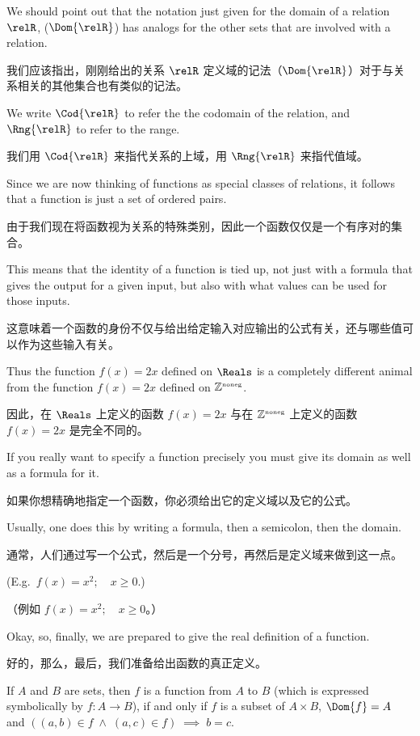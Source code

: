 We should point out that the notation just given for the domain of a 
relation $\relR$, ($\Dom{\relR}$) has analogs for the other 
sets that are involved with a relation.

我们应该指出，刚刚给出的关系 $\relR$ 定义域的记法（$\Dom{\relR}$）对于与关系相关的其他集合也有类似的记法。

We write $\Cod{\relR}$
to refer the the codomain of the relation, and $\Rng{\relR}$
to refer to the range.

我们用 $\Cod{\relR}$ 来指代关系的上域，用 $\Rng{\relR}$ 来指代值域。

Since we are now thinking of functions as special classes of relations, it follows that a function is just 
a set of ordered pairs.

由于我们现在将函数视为关系的特殊类别，因此一个函数仅仅是一个有序对的集合。

This means that the identity of a function is
tied up, not just with a formula that gives the output for a given input,
but also with what values can be used for those inputs.

这意味着一个函数的身份不仅与给出给定输入对应输出的公式有关，还与哪些值可以作为这些输入有关。

Thus the function
$f(x)=2x$ defined on $\Reals$ is a completely different animal from 
the function $f(x)=2x$ defined on ${\mathbb Z}^{\mbox{\tiny noneg}}$.

因此，在 $\Reals$ 上定义的函数 $f(x)=2x$ 与在 ${\mathbb Z}^{\mbox{\tiny noneg}}$ 上定义的函数 $f(x)=2x$ 是完全不同的。

If you really want to
specify a function precisely you must give its domain as well as a 
formula for it.

如果你想精确地指定一个函数，你必须给出它的定义域以及它的公式。

Usually, one does this by writing a formula, then a 
semicolon, then the domain.

通常，人们通过写一个公式，然后是一个分号，再然后是定义域来做到这一点。

(E.g.\ $f(x)=x^2; \quad x \geq 0$.)

（例如 $f(x)=x^2; \quad x \geq 0$。）

Okay, so, finally, we are prepared to give the real
definition of a function.

好的，那么，最后，我们准备给出函数的真正定义。

\begin{defi}
If $A$ and $B$ are sets, then $f$ is a function from $A$ to $B$ (which
is expressed symbolically by $f:A\longrightarrow B$), if and only if
$f$ is a subset of $A\times B$, $\Dom{f}=A$ and $((a,b) \in f \; \land \; (a,c) \in f) \;
\implies \; b=c$.
\end{defi}

